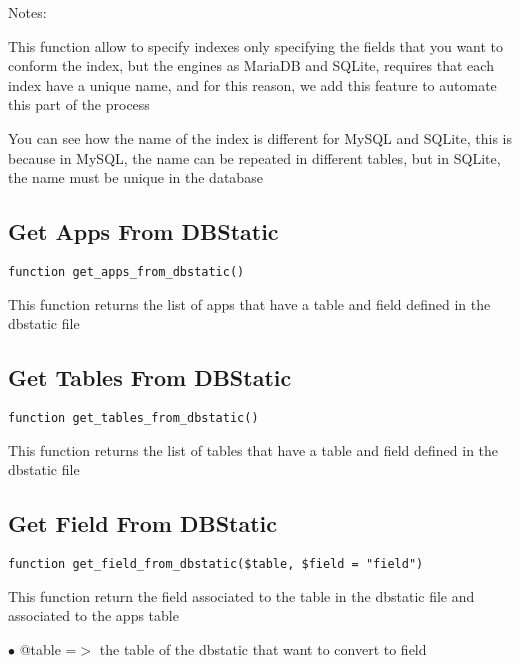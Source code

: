 \documentclass[a4paper]{book}
\begin{document}
Notes:

This function allow to specify indexes only specifying the fields that you want
to conform the index, but the engines as MariaDB and SQLite, requires that each
index have a unique name, and for this reason, we add this feature to automate
this part of the process

You can see how the name of the index is different for MySQL and SQLite, this is
because in MySQL, the name can be repeated in different tables, but in SQLite,
the name must be unique in the database

\hypertarget{toc100}{}
\subsection{Get Apps From DBStatic}

\begin{lstlisting}
function get_apps_from_dbstatic()
\end{lstlisting}

This function returns the list of apps that have a table and field defined
in the dbstatic file

\hypertarget{toc101}{}
\subsection{Get Tables From DBStatic}

\begin{lstlisting}
function get_tables_from_dbstatic()
\end{lstlisting}

This function returns the list of tables that have a table and field defined
in the dbstatic file

\hypertarget{toc102}{}
\subsection{Get Field From DBStatic}

\begin{lstlisting}
function get_field_from_dbstatic($table, $field = "field")
\end{lstlisting}

This function return the field associated to the table in the dbstatic
file and associated to the apps table

\begin{compactitem}
\item[\color{myblue}$\bullet$] @table =$>$ the table of the dbstatic that want to convert to field
\end{compactitem}
\end{document}
